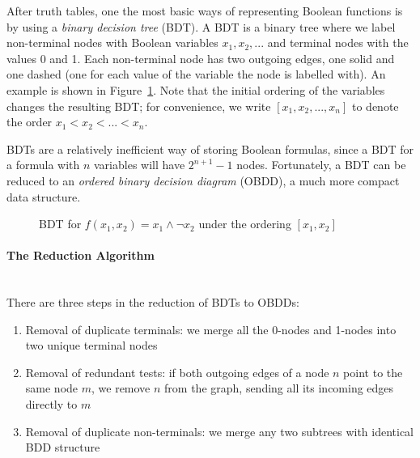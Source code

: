\documentclass[12]{article}
\newcommand{\myparagraph}[1]{\paragraph{#1}\mbox{}\\}
\begin{document}
After truth tables, one the most basic ways of representing Boolean functions is by using a \textit{binary decision tree} (BDT). A BDT is a binary tree where we label non-terminal nodes with Boolean variables $x_1, x_2, ...$ and terminal nodes with the values 0 and 1. Each non-terminal node has two outgoing edges, one solid and one dashed (one for each value of the variable the node is labelled with). An example is shown in Figure~\ref{fig:BDT}. Note that the initial ordering of the variables changes the resulting BDT; for convenience, we write $[x_1, x_2, ..., x_n]$ to denote the order $x_1 < x_2 < ... < x_n$.


BDTs are a relatively inefficient way of storing Boolean formulas, since a BDT for a formula with $n$ variables will have $2^{n+1} - 1$ nodes. Fortunately, a BDT can be reduced to an \textit{ordered binary decision diagram} (OBDD), a much more compact data structure.

\begin{figure}
\centering
{}
	\caption{BDT for $f(x_1, x_2) = x_1 \land \lnot x_2$ under the ordering $[x_1, x_2]$}
\label{fig:BDT}
\end{figure}

\myparagraph{The Reduction Algorithm} 

There are three steps in the reduction of BDTs to OBDDs:
\begin{enumerate}
\item Removal of duplicate terminals: we merge all the 0-nodes and 1-nodes into two unique terminal nodes
\item Removal of redundant tests: if both outgoing edges of a node $n$ point to the same node $m$, we remove $n$ from the graph, sending all its incoming edges directly to $m$ 
\item Removal of duplicate non-terminals: we merge any two subtrees with identical BDD structure
\end{enumerate}
\end{document}
